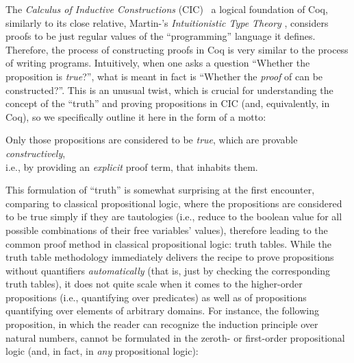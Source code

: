 

The \textit{Calculus of Inductive Constructions}
(CIC)~\cite{Bertot-Casteran:BOOK,Coquand-Huet:IC88} a logical
foundation of Coq, similarly to its close relative, Martin-\loef's
\textit{Intuitionistic Type Theory} \cite{Martin-Loef:84}, considers proofs
to be just regular values of the ``programming'' language it
defines. Therefore, the process of constructing proofs in Coq is
very similar to the process of writing programs. Intuitively, when
one asks a question ``Whether the proposition  is \textit{true}?'', what is
meant in fact is ``Whether the \textit{proof} of  can be
constructed?''. This is an unusual twist, which is crucial for
understanding the concept of the ``truth'' and proving propositions in
CIC (and, equivalently, in Coq), so we specifically outline it here in
the form of a motto:



\begin{center}
Only those propositions are considered to be \emph{true}, which are
provable \emph{constructively},\\ i.e., by providing an \emph{explicit} proof term,
that inhabits them.
\end{center}



This formulation of ``truth'' is somewhat surprising at the first
encounter, comparing to classical propositional logic, where the
propositions are considered to be true simply if they are tautologies
(i.e., reduce to the boolean value  for all possible
combinations of their free variables' values), therefore leading to
the common proof method in classical propositional logic: truth
tables.  While the truth table methodology immediately delivers the
recipe to prove propositions without quantifiers \textit{automatically} (that
is, just by checking the corresponding truth tables), it does not
quite scale when it comes to the higher-order propositions (i.e.,
quantifying over predicates) as well as of propositions quantifying
over elements of arbitrary domains. For instance, the following
proposition, in which the reader can recognize the induction principle
over natural numbers, cannot be formulated in the zeroth- or
first-order propositional logic (and, in fact, in \textit{any} propositional
logic):



